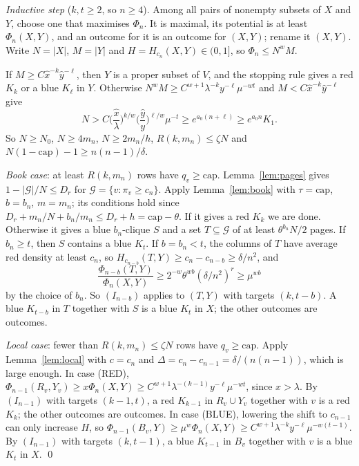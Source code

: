 \documentclass[11pt]{article}
\theoremstyle{definition}
\theoremstyle{remark}
\begin{document}
\emph{Inductive step} ($k,t\ge2$, so $n\ge4$). Among all pairs of nonempty subsets of $X$ and $Y$, choose one that
maximises $\Phi_n$. It is maximal, its potential is at least $\Phi_n(X,Y)$, and an outcome for it is an outcome for
$(X,Y)$; rename it $(X,Y)$. Write $N=|X|$, $M=|Y|$ and $H=H_{c_n}(X,Y)\in(0,1]$, so $\Phi_n\le N^wM$.

If $M\ge C\hat x^{-k}\hat y^{-\ell}$, then $Y$ is a proper subset of $V$, and the stopping rule gives a red $K_k$ or a
blue $K_\ell$ in $Y$. Otherwise $N^wM\ge C^{w+1}\lambda^{-k}y^{-\ell}\mu^{-wt}$ and $M<C\hat x^{-k}\hat y^{-\ell}$ give
\[
N>C\Big(\frac{\hat x}\lambda\Big)^{k/w}\Big(\frac{\hat y}y\Big)^{\ell/w}\mu^{-t}\ge e^{a_0(n+\ell)}\ge e^{a_0n}K_1.
\]
So $N\ge N_0$, $N\ge4m_n$, $N\ge2m_n/h$, $R(k,m_n)\le\zeta N$ and $N(1-\mathrm{cap})-1\ge n(n-1)/\delta$.

\emph{Book case}: at least $R(k,m_n)$ rows have $q_v\ge\mathrm{cap}$. Lemma~\ref{lem:pages} gives
$1-|\mathcal G|/N\le D_r$ for $\mathcal G=\{v:\pi_v\ge c_n\}$. Apply Lemma~\ref{lem:book} with $\tau=\mathrm{cap}$,
$b=b_n$, $m=m_n$; its conditions hold since $D_r+m_n/N+b_n/m_n\le D_r+h=\mathrm{cap}-\theta$. If it gives a red $K_k$
we are done. Otherwise it gives a blue $b_n$-clique $S$ and a set $T\subseteq\mathcal G$ of at least $\theta^{b_n}N/2$
pages. If $b_n\ge t$, then $S$ contains a blue $K_t$. If $b=b_n<t$, the columns of $T$ have average red density at least
$c_n$, so $H_{c_{n-b}}(T,Y)\ge c_n-c_{n-b}\ge\delta/n^2$, and
\[
\frac{\Phi_{n-b}(T,Y)}{\Phi_n(X,Y)}\ge2^{-w}\theta^{wb}(\delta/n^2)^r\ge\mu^{wb}
\]
by the choice of $b_n$. So $(I_{n-b})$ applies to $(T,Y)$ with targets $(k,t-b)$. A blue $K_{t-b}$ in $T$ together
with $S$ is a blue $K_t$ in $X$; the other outcomes are outcomes.

\emph{Local case}: fewer than $R(k,m_n)\le\zeta N$ rows have $q_v\ge\mathrm{cap}$. Apply Lemma~\ref{lem:local} with
$c=c_n$ and $\Delta=c_n-c_{n-1}=\delta/(n(n-1))$, which is large enough. In case (RED),
$\Phi_{n-1}(R_v,Y_v)\ge x\Phi_n(X,Y)\ge C^{w+1}\lambda^{-(k-1)}y^{-\ell}\mu^{-wt}$, since $x>\lambda$. By $(I_{n-1})$ with
targets $(k-1,t)$, a red $K_{k-1}$ in $R_v\cup Y_v$ together with $v$ is a red $K_k$; the other outcomes are outcomes.
In case (BLUE), lowering the shift to $c_{n-1}$ can only increase $H$, so
$\Phi_{n-1}(B_v,Y)\ge\mu^w\Phi_n(X,Y)\ge C^{w+1}\lambda^{-k}y^{-\ell}\mu^{-w(t-1)}$. By $(I_{n-1})$ with targets
$(k,t-1)$, a blue $K_{t-1}$ in $B_v$ together with $v$ is a blue $K_t$ in $X$. \qed

\end{document}
